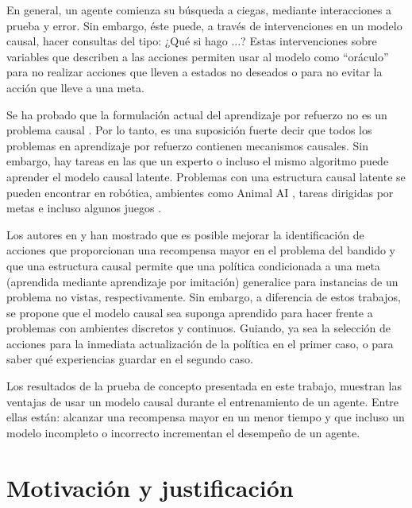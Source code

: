En general, un agente comienza su búsqueda a ciegas,
mediante interacciones a prueba y error.
Sin embargo, éste puede, a través de intervenciones
en un modelo causal, hacer consultas del tipo: ¿Qué si hago ...? Estas intervenciones sobre variables 
que describen a las acciones permiten usar al modelo
como ``oráculo'' para no realizar acciones que lleven
a estados no deseados o para no evitar la acción que
lleve a una meta.

Se ha probado que la formulación actual del aprendizaje
por refuerzo no es un problema causal \cite{gonzalez2019reinforcement}.
Por lo tanto, es una suposición fuerte 
decir que todos los problemas 
en aprendizaje por refuerzo contienen mecanismos causales. 
Sin embargo, hay tareas en las
que un experto o incluso el mismo algoritmo puede
aprender el modelo causal latente.
Problemas con una estructura causal latente
se pueden encontrar en robótica, ambientes como Animal AI \cite{beyret2019animalai}, 
tareas dirigidas por metas \cite{nair2019causal} e
incluso algunos juegos \cite{madumal2019explainable}.



Los autores en  \cite{lattimore2016causal} y \cite{nair2019causal} han mostrado
que es posible mejorar la identificación de acciones que proporcionan una recompensa mayor en
el problema del bandido y 
que una estructura causal permite
que una política condicionada a una
meta (aprendida mediante aprendizaje por imitación) generalice para instancias de 
un problema no vistas, respectivamente.
Sin embargo, a diferencia de estos trabajos,
se propone que el modelo causal sea suponga 
aprendido para hacer
frente a problemas con ambientes discretos 
y continuos. 
Guiando, ya sea la selección de acciones
para la inmediata actualización de la política en el primer caso, o para saber qué experiencias \cite{mnih2013playing} guardar en el segundo caso.


Los resultados de la prueba de concepto presentada en este trabajo, 
muestran las ventajas de usar un modelo causal durante el entrenamiento de
un agente. Entre ellas están: alcanzar una recompensa mayor en un menor tiempo y
que incluso un modelo incompleto o incorrecto incrementan el desempeño de un agente.


\section{Motivación y justificación}


